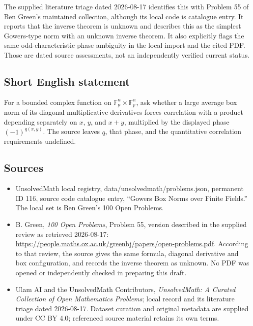 \documentclass[11pt]{article}
\newcommand{\F}{\mathbb{F}}
\begin{document}
The supplied literature triage dated 2026-08-17 identifies this with Problem 55 of Ben Green's maintained collection, although its local code is catalogue entry. It reports that the inverse theorem is unknown and describes this as the simplest Gowers-type norm with an unknown inverse theorem. It also explicitly flags the same odd-characteristic phase ambiguity in the local import and the cited PDF. Those are dated source assessments, not an independently verified current status.
\subsection{Short English statement}
For a bounded complex function on $\F_p^n\times\F_p^n$, ask whether a large average box norm of its diagonal multiplicative derivatives forces correlation with a product depending separately on $x$, $y$, and $x+y$, multiplied by the displayed phase $(-1)^{q(x,y)}$. The source leaves $q$, that phase, and the quantitative correlation requirements undefined.
\subsection{Sources}
\begin{itemize}
\item UnsolvedMath local registry, data/unsolvedmath/problems.json, permanent ID 116, source code catalogue entry, ``Gowers Box Norms over Finite Fields.'' The local set is Ben Green's 100 Open Problems.
\item B. Green, \emph{100 Open Problems}, Problem 55, version described in the supplied review as retrieved 2026-08-17: \url{https://people.maths.ox.ac.uk/greenbj/papers/open-problems.pdf}. According to that review, the source gives the same formula, diagonal derivative and box configuration, and records the inverse theorem as unknown. No PDF was opened or independently checked in preparing this draft.
\item Ulam AI and the UnsolvedMath Contributors, \emph{UnsolvedMath: A Curated Collection of Open Mathematics Problems}; local record and its literature triage dated 2026-08-17. Dataset curation and original metadata are supplied under CC BY 4.0; referenced source material retains its own terms.
\end{itemize}
\end{document}
